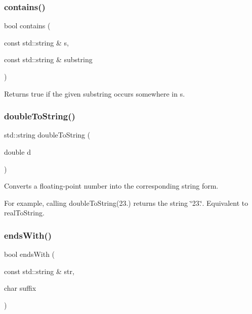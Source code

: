 \subsubsection{\texorpdfstring{contains()}{contains()}\hspace{0.1cm}{\footnotesize\ttfamily [2/2]}}
{\footnotesize\ttfamily bool contains (\begin{DoxyParamCaption}\item[{const std\+::string \&}]{s,  }\item[{const std\+::string \&}]{substring }\end{DoxyParamCaption})}



Returns true if the given substring occurs somewhere in s. 

\mbox{\label{namespacesgl_1_1priv_1_1strlib_a93b653853091dcbcb8d6f7ae75b48720}} 
\subsubsection{\texorpdfstring{double\+To\+String()}{doubleToString()}}
{\footnotesize\ttfamily std\+::string double\+To\+String (\begin{DoxyParamCaption}\item[{double}]{d }\end{DoxyParamCaption})}



Converts a floating-\/point number into the corresponding string form. 

For example, calling {\ttfamily double\+To\+String(23.)} returns the string {\ttfamily \char`\"{}23.\char`\"{}}. Equivalent to real\+To\+String. \mbox{\label{namespacesgl_1_1priv_1_1strlib_af69d242dc4439ee48dc41d92fe604fd7}} 
\subsubsection{\texorpdfstring{ends\+With()}{endsWith()}\hspace{0.1cm}{\footnotesize\ttfamily [1/2]}}
{\footnotesize\ttfamily bool ends\+With (\begin{DoxyParamCaption}\item[{const std\+::string \&}]{str,  }\item[{char}]{suffix }\end{DoxyParamCaption})}



